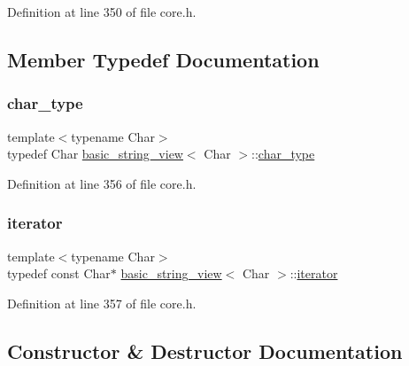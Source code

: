 Definition at line 350 of file core.\+h.



\subsection{Member Typedef Documentation}
\mbox{\label{classbasic__string__view_a5c0ddf97eacf1624a31ecbb504e164f8}} 
\subsubsection{\texorpdfstring{char\+\_\+type}{char\_type}}
{\footnotesize\ttfamily template$<$typename Char$>$ \\
typedef Char \hyperlink{classbasic__string__view}{basic\+\_\+string\+\_\+view}$<$ Char $>$\+::\hyperlink{classbasic__string__view_a5c0ddf97eacf1624a31ecbb504e164f8}{char\+\_\+type}}



Definition at line 356 of file core.\+h.

\mbox{\label{classbasic__string__view_aac52df0e56cb4b197372306e0da039e0}} 
\subsubsection{\texorpdfstring{iterator}{iterator}}
{\footnotesize\ttfamily template$<$typename Char$>$ \\
typedef const Char$\ast$ \hyperlink{classbasic__string__view}{basic\+\_\+string\+\_\+view}$<$ Char $>$\+::\hyperlink{classbasic__string__view_aac52df0e56cb4b197372306e0da039e0}{iterator}}



Definition at line 357 of file core.\+h.



\subsection{Constructor \& Destructor Documentation}
\mbox{\label{classbasic__string__view_a3285fa5f62f1de2776c6a3fcc33cfe0a}} 
